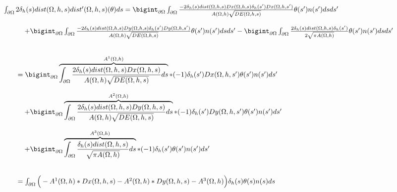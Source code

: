 \documentclass[11pt,a4paper]{article}
\begin{document}
\begin{equation}
\begin{array}{l}
\int_{\partial\Omega}2\delta_h(s)dist(\Omega,h,s)dist'(\Omega,h,s)(\theta)ds=\bigint_{\partial\Omega}\int_{\partial\Omega}\frac{-2\delta_h(s)dist(\Omega,h,s)Dx(\Omega,h,s)\delta_h(s')Dx(\Omega,h,s')}{A(\Omega,h)\sqrt{DE(\Omega,h,s)}}\theta(s')n(s')dsds'\\
\\
\qquad \quad+\bigint_{\partial\Omega}\int_{\partial\Omega}\frac{-2\delta_h(s)dist(\Omega,h,s)Dy(\Omega,h,s)\delta_h(s')Dy(\Omega,h,s')}{A(\Omega,h)\sqrt{DE(\Omega,h,s)}}\theta(s')n(s')dsds'-\bigint_{\partial\Omega}\int_{\partial\Omega}\frac{2\delta_h(s)dist(\Omega,h,s)\delta_h(s')}{2\sqrt{\pi A(\Omega,h)}}\theta(s')n(s')dsds'\\
\\
\\
\qquad = \bigint_{\partial\Omega}\overbrace{\int_{\partial\Omega}\frac{2\delta_h(s)dist(\Omega,h,s)Dx(\Omega,h,s)}{A(\Omega,h)\sqrt{DE(\Omega,h,s)}}ds}^{A^1(\Omega,h)}*(-1)\delta_h(s')Dx(\Omega,h,s')\theta(s')n(s')ds'\\
\\
\qquad \quad + \bigint_{\partial\Omega}\overbrace{\int_{\partial\Omega}\frac{2\delta_h(s)dist(\Omega,h,s)Dy(\Omega,h,s)}{A(\Omega,h)\sqrt{DE(\Omega,h,s)}}ds}^{A^2(\Omega,h)}*(-1)\delta_h(s')Dy(\Omega,h,s')\theta(s')n(s')ds'\\
\\
\qquad \quad + \bigint_{\partial\Omega}\overbrace{\int_{\partial\Omega}\frac{\delta_h(s)dist(\Omega,h,s)}{\sqrt{\pi A(\Omega,h)}}ds}^{A^3(\Omega,h)}*(-1)\delta_h(s')\theta(s')n(s')ds'\\
\\
\\
\qquad =\int_{\partial\Omega}\Big(-A^1(\Omega,h)*Dx(\Omega,h,s)-A^2(\Omega,h)*Dy(\Omega,h,s)-A^3(\Omega,h)\Big)\delta_h(s)\theta(s)n(s)ds
\end{array}
\end{equation}
\end{document}
